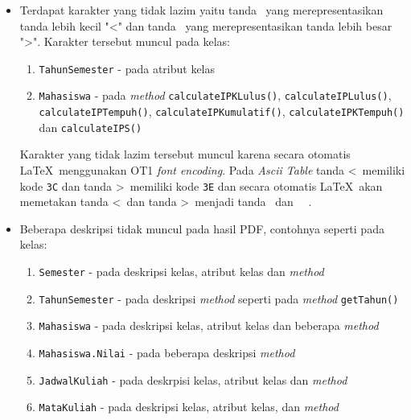 \begin{itemize}
	\item Terdapat karakter yang tidak lazim yaitu tanda \textexclamdown\ yang merepresentasikan tanda lebih kecil "<" dan tanda \textquestiondown\ yang merepresentasikan tanda lebih besar ">". Karakter tersebut muncul pada kelas: 
		\begin{enumerate}
			\item {\tt TahunSemester} - pada atribut kelas
			\item {\tt Mahasiswa} - pada {\it method} {\tt calculateIPKLulus()}, {\tt calculateIPLulus()}, {\tt calculateIPTempuh()}, {\tt calculateIPKumulatif()}, {\tt calculateIPKTempuh()} dan {\tt calculateIPS()}
		\end{enumerate}
		Karakter yang tidak lazim tersebut muncul karena secara otomatis \LaTeX\ menggunakan OT1 {\it font encoding}. Pada {\it Ascii Table} tanda \textless\ memiliki kode {\tt 3C} dan tanda \textgreater\ memiliki kode {\tt 3E} dan secara otomatis \LaTeX\ akan memetakan tanda \textless\ dan tanda \textgreater\ menjadi tanda \textexclamdown\ dan \textquestiondown\ ~\cite{ot1fontencoding:04:ot1fontencoding}. %
	\item Beberapa deskripsi tidak muncul pada hasil PDF, contohnya seperti pada kelas:
		\begin{enumerate}
			\item {\tt Semester} - pada deskripsi kelas, atribut kelas dan {\it method}
			\item {\tt TahunSemester} - pada deskripsi {\it method} seperti pada {\it method} {\tt getTahun()}
			\item {\tt Mahasiswa} - pada deskripsi kelas, atribut kelas dan beberapa {\it method}
			\item {\tt Mahasiswa.Nilai} - pada beberapa deskripsi {\it method}
			\item {\tt JadwalKuliah} - pada deskrpisi kelas, atribut kelas dan {\it method}
			\item {\tt MataKuliah} - pada deskripsi kelas, atribut kelas, dan {\it method}

\end{enumerate}
\end{itemize}

